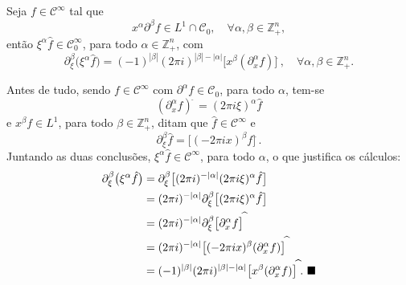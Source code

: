 \documentclass[../distribution_theory_notes.tex]{subfiles}
\begin{document}
\begin{crl*}
	Seja \(f\in \mathcal{C}^{\infty}\) tal que
	\[
		x^{\alpha }\partial ^{\beta }f\in L^{1}\cap \mathcal{C}_{0},\quad \forall \alpha ,\beta \in \mathbb{Z}_{+}^{n},
	\]
	então \(\xi ^{\alpha }\hat{f}\in \mathcal{C}_{0}^{\infty}\), para todo \(\alpha \in \mathbb{Z}_{+}^{n}\), com
	\[
		\partial _{\xi }^{\beta }\bigl(\xi ^{\alpha }\hat{f}\bigr)
		=(-1)^{|\beta |}(2\pi i)^{|\beta |-|\alpha |}
		\bigl[x^{\beta }(\partial _{x}^{\alpha }f)\bigr]^{\widehat{\; }},
		\quad \forall \alpha ,\beta \in \mathbb{Z}_{+}^{n}.
	\]
\end{crl*}
\begin{proof*}
	Antes de tudo, sendo \(f\in \mathcal{C}^{\infty}\) com \(\partial ^{\alpha }f\in \mathcal{C}_{0}\), para todo \(\alpha \), tem-se
	\[
		(\partial _{x}^{\alpha }f)^{\widehat{\; }}=(2\pi i\xi )^{\alpha }\hat{f}
	\]
	e \(x^{\beta }f\in L^{1}\), para todo \(\beta \in \mathbb{Z}_{+}^{n}\), ditam que \(\hat{f}\in \mathcal{C}^{\infty}\) e
	\[
		\partial _{\xi }^{\beta }\hat{f}=\bigl[(-2\pi i x)^{\beta }f\bigr]^{\widehat{\; }}.
	\]
	Juntando as duas conclusões, \(\xi ^{\alpha }\hat{f}\in \mathcal{C}^{\infty}\), para todo \(\alpha \), o que justifica os cálculos:
	\begin{align*}
		\partial _{\xi }^{\beta }\bigl(\xi ^{\alpha }\hat{f}\bigr)
		 & =\partial _{\xi }^{\beta }\bigl[(2\pi i)^{-|\alpha |}(2\pi i\xi )^{\alpha }\hat{f}\bigr]                                          \\
		 & =(2\pi i)^{-|\alpha |}\partial _{\xi }^{\beta }\bigl[(2\pi i\xi )^{\alpha }\hat{f}\bigr]                                          \\
		 & =(2\pi i)^{-|\alpha |}\partial _{\xi }^{\beta }\bigl[\partial _{x}^{\alpha }f\bigr]^{\widehat{\; }}                               \\
		 & =(2\pi i)^{-|\alpha |}\bigl[(-2\pi i x)^{\beta }(\partial _{x}^{\alpha }f)\bigr]^{\widehat{\; }}                                  \\
		 & =(-1)^{|\beta |}(2\pi i)^{|\beta |-|\alpha |}\bigl[x^{\beta }(\partial _{x}^{\alpha }f)\bigr]^{\widehat{\; }}. \text{ $\blacksquare$}
	\end{align*}
\end{proof*}
\end{document}
